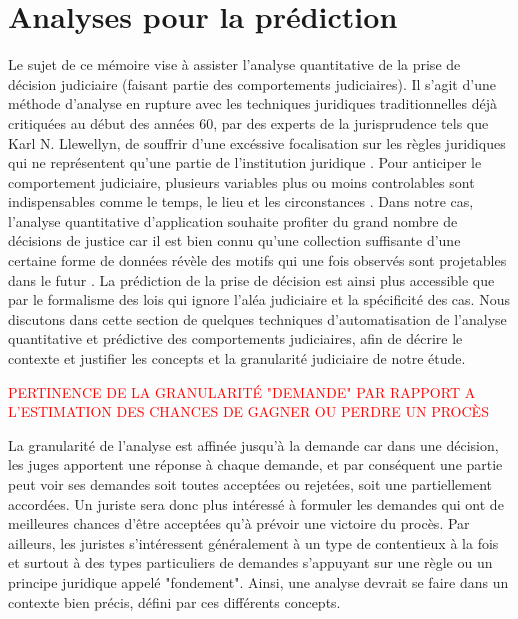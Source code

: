 \section{Analyses pour la prédiction}
\label{sec:literature:legalpredict}
Le sujet de ce mémoire vise à assister l'analyse quantitative de la prise de décision judiciaire (faisant partie des comportements judiciaires). Il s'agit d'une méthode d'analyse en rupture avec les techniques juridiques traditionnelles déjà critiquées au début des années 60, par des experts de la jurisprudence tels que Karl N. Llewellyn, de souffrir d'une excéssive focalisation sur les règles juridiques qui ne représentent qu'une partie de l'institution juridique \citep{llewellyn1962jurisprudence}. Pour anticiper le comportement judiciaire, plusieurs variables plus ou moins controlables sont indispensables comme le temps, le lieu et les circonstances \citep{ulmer1963quantitative}. Dans notre cas, l'analyse quantitative d'application souhaite profiter du grand nombre de décisions de justice car il est bien connu qu'une collection suffisante d'une certaine forme de données révèle des motifs qui une fois observés sont projetables dans le futur \citep{ulmer1963quantitative}. La prédiction de la prise de décision est ainsi plus accessible que par le formalisme des lois qui ignore l'aléa judiciaire et la spécificité des cas.  Nous discutons dans cette section de quelques techniques d'automatisation de l'analyse quantitative et prédictive des comportements judiciaires, afin de décrire le contexte et justifier les concepts et la granularité judiciaire de notre étude.

\textcolor{red}{PERTINENCE DE LA GRANULARITÉ "DEMANDE" PAR RAPPORT A L'ESTIMATION DES CHANCES DE GAGNER OU PERDRE UN PROCÈS}

La granularité de l'analyse est affinée jusqu'à la demande car dans une décision, les juges apportent une réponse à chaque demande, et par conséquent une partie peut voir ses demandes soit toutes acceptées ou rejetées, soit une partiellement accordées. Un juriste sera donc plus intéressé à formuler les demandes qui ont de meilleures chances d'être acceptées qu'à prévoir une victoire du procès. Par ailleurs, les juristes s'intéressent généralement à un type de contentieux à la fois et surtout à des types particuliers de demandes s'appuyant sur une règle ou un principe juridique appelé "fondement". Ainsi, une analyse devrait se faire dans un contexte bien précis, défini par ces différents concepts.

